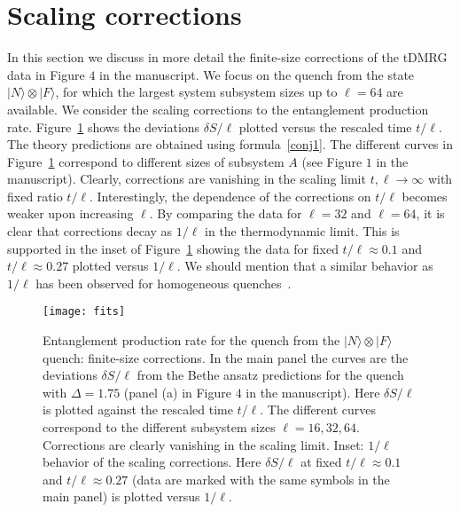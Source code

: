 \documentclass[twocolumn,superscriptaddress,prb,10pt]{revtex4-1}
\begin{document}
\section{Scaling corrections} 
\label{s-corr}

In this section we discuss in more detail the finite-size corrections of the tDMRG data in 
Figure $4$ in the manuscript. We focus on the quench from the state $|N\rangle\otimes|F\rangle$, 
for which the largest system subsystem sizes up to $\ell=64$ are available. We consider the 
scaling corrections to the entanglement production rate. Figure~\ref{fig7} 
shows the deviations $\delta S/\ell$ plotted versus the rescaled time $t/\ell$. The theory 
predictions are obtained using formula~\eqref{conj1}. The different curves in 
Figure~\ref{fig7} correspond to different sizes of subsystem $A$ (see Figure $1$ in the 
manuscript). Clearly, corrections are vanishing in the scaling limit $t,\ell\to\infty$ with 
fixed ratio $t/\ell$. Interestingly, the dependence of the corrections on $t/\ell$ becomes 
weaker upon increasing $\ell$. By comparing the data for $\ell=32$ and $\ell=64$, it is clear 
that corrections decay as $1/\ell$ in the thermodynamic limit. This is supported in the inset 
of Figure~\ref{fig7} showing the data for fixed $t/\ell\approx 0.1$ and $t/\ell\approx 0.27$ 
plotted versus $1/\ell$. We should mention that a similar behavior as $1/\ell$ has been observed 
for homogeneous quenches~\cite{alba-2016}. 

\begin{figure}[t]
\texttt{[image: fits]}
\caption{ Entanglement production rate for the quench from the $|N\rangle\otimes|F\rangle$ quench: 
 finite-size corrections. In the main panel the curves are the deviations $\delta S/\ell$ from 
 the Bethe ansatz predictions for the quench with $\Delta=1.75$ (panel (a) in Figure $4$ in the 
 manuscript). Here $\delta S/\ell$ is plotted against the rescaled time $t/\ell$. The 
 different curves correspond to the different subsystem sizes $\ell=16,32,64$. Corrections are 
 clearly vanishing in the scaling limit. Inset: $1/\ell$ behavior of the scaling corrections. 
 Here $\delta S/\ell$ at fixed $t/\ell\approx 0.1$ and $t/\ell\approx0.27$ (data are marked with the 
 same symbols in the main panel) is plotted versus $1/\ell$.  
}
\label{fig7}
\end{figure}
\end{document}
